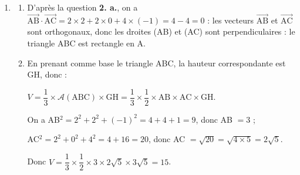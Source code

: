 \documentclass[10pt]{article}
\providecommand{\R}{\mathbb{R}}
\providecommand{\vect}[1]{\overrightarrow{#1}}
\begin{document}
\begin{enumerate}
\begin{enumerate}
Ces trois équations ont pour solution $t = 2$, donc G$(7~;~-4~;~4) \in \Delta$.
		\item 
Le point H appartient à la droite $\Delta$ et au plan (ABC). Donc ses coordonnées $x,\,y,\:z$ vérifient le système :

$\left\{\begin{array}{l c l}
x &=& -1 + 4t\\
y &=& \phantom{-}6 - 5t \quad\text{avec}\: t \in \R\\
z &=& \phantom{-}8 - 2t\\
4x - 5y - 2z + 5 &=& 0
\end{array}\right.$

En replaçant $x,\:y,\: z$ par leurs valeurs en fonction de $t$ dans la dernière équation, on obtient :

$4(- 1 + 4t) - 5(6 - 5t) - 2(8 - 2t) + 5 = 0\iff -4 + 16t - 30 + 25t - 16 + 4t + 5 = 0\iff 45t -45 = 0 \iff 45t = 45 \iff t = 1$.

Les coordonnées de H sont donc $(-1 + 4~;~6 - 5~;~8 - 2)$ soit H(3~;~1~;~6).
		\item 
		
		La distance du point G au plan (ABC) est donc égale à GH.
		
		Or GH$^2 = (3 - 7)^2 + (1 + 4)^2 + (6 - 4)^2 = 16 + 25 + 4 = 45$, d'où \\
		GH $= \sqrt{45} = \sqrt{9 \times 5} = \sqrt{9} \sqrt{5} = 3\sqrt{5}$.
	\end{enumerate}
\item
	\begin{enumerate}
		\item 
D'après la question \textbf{2. a.}, on a $\vect{\text{AB}} \cdot \vect{\text{AC}}  = 2 \times 2 + 2 \times 0 + 4 \times (- 1) = 4 - 4 = 0$ : les vecteurs $\vect{\text{AB}} $ et  $\vect{\text{AC}}$ sont orthogonaux, donc les droites (AB) et (AC) sont perpendiculaires : le triangle ABC est rectangle en A.

		\item 
En prenant comme base le triangle ABC, la hauteur correspondante est GH, donc :

$V = \dfrac13 \times \mathcal{A}(\text{ABC}) \times \text{GH} = \dfrac13 \times \dfrac12 \times \text{AB} \times \text{AC}  \times \text{GH}$.

On a AB$^2 = 2^2 + 2^2 + (- 1)^2 = 4 + 4 + 1 = 9$, donc AB $= 3$ ;

AC$^2 = 2^2 + 0^2 + 4^2 = 4 + 16 = 20$, donc AC $ = \sqrt{20} = \sqrt{4 \times 5} = 2\sqrt{5}$.

Donc $V = \dfrac13 \times \dfrac12 \times 3\times 2\sqrt{5}\times 3\sqrt{5} = 15$.
		

	\end{enumerate}
\end{enumerate}
\end{document}
